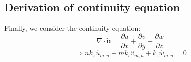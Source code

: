 \documentclass{article} \usepackage{amsfonts,amsmath, amssymb, xcolor, amsthm,}
\begin{document}
    \subsection{Derivation of continuity equation}

    Finally, we consider the continuity equation: \[\nabla \cdot \tilde{\bm{u}}
    = \frac{\partial \tilde{u}}{\partial x} +\frac{\partial \tilde{v}}{\partial
    y} +\frac{\partial \tilde{w}}{\partial z}\] \begin{equation}\Rightarrow
    nk_x\hat{u}_{m,n} +mk_v\hat{v}_{m,n}+k_z\hat{w}_{m,n} = 0 \end{equation}
    
\end{document}
